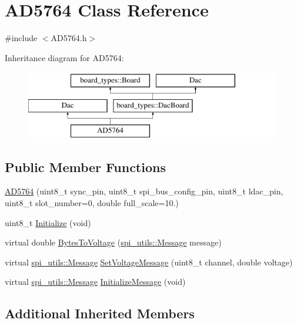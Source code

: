 \hypertarget{classAD5764}{}\section{A\+D5764 Class Reference}
\label{classAD5764}


{\ttfamily \#include $<$A\+D5764.\+h$>$}

Inheritance diagram for A\+D5764\+:\begin{figure}[H]
\begin{center}
\leavevmode
\includegraphics[height=3.000000cm]{classAD5764}
\end{center}
\end{figure}
\subsection*{Public Member Functions}
\begin{DoxyCompactItemize}
\item 
\mbox{\hyperlink{classAD5764_ab8644f724d2f0fbe25f4a181d2e315d6}{A\+D5764}} (uint8\+\_\+t sync\+\_\+pin, uint8\+\_\+t spi\+\_\+bus\+\_\+config\+\_\+pin, uint8\+\_\+t ldac\+\_\+pin, uint8\+\_\+t slot\+\_\+number=0, double full\+\_\+scale=10.)
\item 
uint8\+\_\+t \mbox{\hyperlink{classAD5764_ab98c5418cf46198dd4b967e143896a3a}{Initialize}} (void)
\item 
virtual double \mbox{\hyperlink{classAD5764_a729015992eda059ae615373d1db53823}{Bytes\+To\+Voltage}} (\mbox{\hyperlink{structspi__utils_1_1Message}{spi\+\_\+utils\+::\+Message}} message)
\item 
virtual \mbox{\hyperlink{structspi__utils_1_1Message}{spi\+\_\+utils\+::\+Message}} \mbox{\hyperlink{classAD5764_a62887ed89fedc4db68f2a54324e1fac0}{Set\+Voltage\+Message}} (uint8\+\_\+t channel, double voltage)
\item 
virtual \mbox{\hyperlink{structspi__utils_1_1Message}{spi\+\_\+utils\+::\+Message}} \mbox{\hyperlink{classAD5764_a02710f0508562f2a293dd6d706c0cc3c}{Initialize\+Message}} (void)
\end{DoxyCompactItemize}
\subsection*{Additional Inherited Members}


